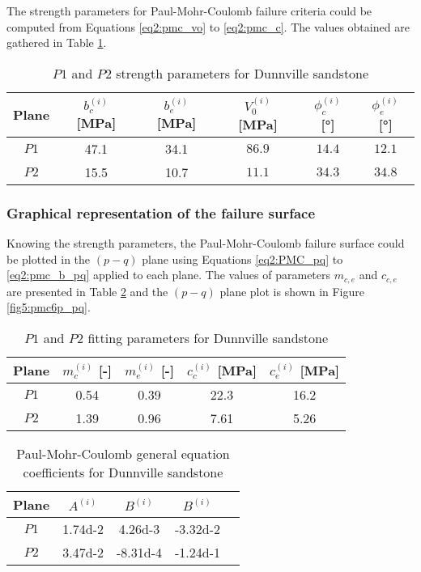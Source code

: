 The strength parameters for Paul-Mohr-Coulomb failure criteria could be computed from Equations \ref{eq2:pmc_vo} to \ref{eq2:pmc_c}. The values obtained are gathered in Table \ref{tb5:dunn_strpara}. 

\begin{table} [p]
    \centering 
    \begin{tabular}{cccccc}
        \hline 
        Plane & $b_c^{(i)}$ [\si{MPa}] & $b_e^{(i)}$ [\si{MPa}] & $V_0^{(i)}$ [\si{MPa}] & $\phi_c^{(i)}$ [\si{\degree}] & $\phi_e^{(i)}$ [\si{\degree}] \\
        \hline
        \hline
        $P1$ & 47.1 & 34.1 & $86.9$ & $14.4$ & $12.1$\\
        $P2$ & 15.5 & 10.7 & $11.1$ & $34.3$ & $34.8$ \\
        \hline
    \end{tabular}
    \captionsetup{justification=centering}
    \caption{$P1$ and $P2$ strength parameters for Dunnville sandstone}
    \label{tb5:dunn_strpara}
\end{table}

\subsubsection{Graphical representation of the failure surface}

Knowing the strength parameters, the Paul-Mohr-Coulomb failure surface could be plotted in the $(p-q)$ plane using Equations \ref{eq2:PMC_pq} to \ref{eq2:pmc_b_pq} applied to each plane. The values of parameters $m_{c,e}$ and $c_{c,e}$ are presented in Table \ref{tb5:dunn_pq_para} and the $(p-q)$ plane plot is shown in Figure \ref{fig5:pmc6p_pq}.

\begin{table} [p]
    \centering 
    \begin{tabular}{ccccc}
        \hline 
        Plane & $m_c^{(i)}$ [-] & $m_e^{(i)}$ [-] & $c_c^{(i)}$ [\si{MPa}] & $c_e^{(i)}$ [\si{MPa}] \\
        \hline
        \hline
        $P1$ & 0.54 & 0.39 & 22.3 & 16.2 \\
        $P2$ & 1.39 & 0.96 & 7.61 & 5.26\\
        \hline
    \end{tabular}
    \captionsetup{justification=centering}
    \caption{$P1$ and $P2$ fitting parameters for Dunnville sandstone}
    \label{tb5:dunn_pq_para}
\end{table}

\begin{table} [p]
    \centering 
    \begin{tabular}{ccccc}
        \hline 
        Plane & $A^{(i)}$ & $B^{(i)}$ & $B^{(i)}$ \\
        \hline
        \hline
        $P1$ & \num{1.74d-2} & \num{4.26d-3} & \num{-3.32d-2} \\
        $P2$ & \num{3.47d-2} & \num{-8.31d-4} & \num{-1.24d-1} \\
        \hline
    \end{tabular}
    \captionsetup{justification=centering}
    \caption{Paul-Mohr-Coulomb general equation coefficients for Dunnville sandstone}
    \label{tb5:dunn_abc}
\end{table}

